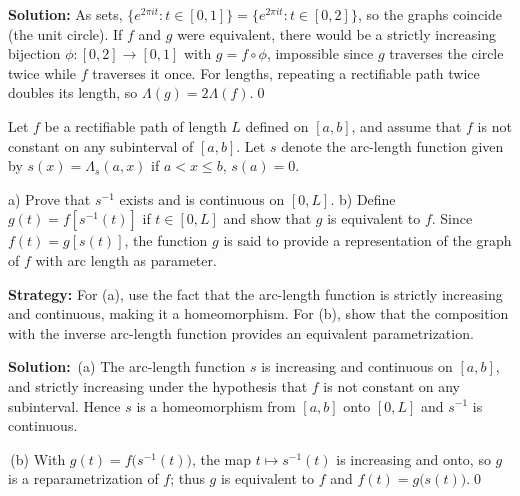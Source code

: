 \bigskip\noindent\textbf{Solution:}
As sets, $\{e^{2\pi it}:t\in[0,1]\}=\{e^{2\pi it}:t\in[0,2]\}$, so the graphs coincide (the unit circle). If $f$ and $g$ were equivalent, there would be a strictly increasing bijection $\phi:[0,2]\to[0,1]$ with $g=f\circ\phi$, impossible since $g$ traverses the circle twice while $f$ traverses it once. For lengths, repeating a rectifiable path twice doubles its length, so $\Lambda(g)=2\Lambda(f)$.\qed


\begin{problembox}
Let $f$ be a rectifiable path of length $L$ defined on $[a, b]$, and assume that $f$ is not constant on any subinterval of $[a, b]$. Let $s$ denote the arc-length function given by $s(x) = \Lambda_s(a, x)$ if $a < x \leq b$, $s(a) = 0$.

a) Prove that $s^{-1}$ exists and is continuous on $[0, L]$.
b) Define $g(t) = f[s^{-1}(t)]$ if $t \in [0, L]$ and show that $g$ is equivalent to $f$. Since $f(t) = g[s(t)]$, the function $g$ is said to provide a representation of the graph of $f$ with arc length as parameter.
\end{problembox}

\noindent\textbf{Strategy:} For (a), use the fact that the arc-length function is strictly increasing and continuous, making it a homeomorphism. For (b), show that the composition with the inverse arc-length function provides an equivalent parametrization.

\bigskip\noindent\textbf{Solution:}
\,(a) The arc-length function $s$ is increasing and continuous on $[a,b]$, and strictly increasing under the hypothesis that $f$ is not constant on any subinterval. Hence $s$ is a homeomorphism from $[a,b]$ onto $[0,L]$ and $s^{-1}$ is continuous.

\,(b) With $g(t)=f\big(s^{-1}(t)\big)$, the map $t\mapsto s^{-1}(t)$ is increasing and onto, so $g$ is a reparametrization of $f$; thus $g$ is equivalent to $f$ and $f(t)=g\big(s(t)\big)$.\qed


